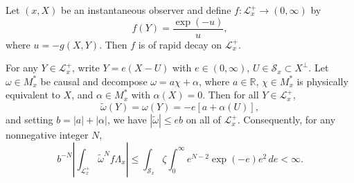Let $(x, X)$ be an instantaneous observer and define $f: \mathcal{L}_x^+ \rightarrow (0, \infty)$ by
$$f(Y) = \frac{\exp(-u)}{u},$$
where $u = -g(X, Y)$. Then $f$ is of rapid decay on $\mathcal{L}_x^+$.

For any $Y \in \mathcal{L}_x^+$, write $Y = e(X - U)$ with $e \in (0, \infty)$, $U \in \mathcal{S}_x \subset X^\perp$. Let $\omega \in M_x^*$ be causal and decompose $\omega = a\chi + \alpha$, where $a \in \mathbb{R}$, $\chi \in M_x^*$ is physically equivalent to $X$, and $\alpha \in M_x^*$ with $\alpha(X) = 0$. Then for all $Y \in \mathcal{L}_x^+$,
$$\tilde{\omega}(Y) = \omega(Y) = -e[a + \alpha(U)],$$
and setting $b = |a| + |\alpha|$, we have $|\tilde{\omega}| \leq e b$ on all of $\mathcal{L}_x^+$. Consequently, for any nonnegative integer $N$,
$$b^{-N} \left| \int_{\mathcal{L}_x^+} \tilde{\omega}^N f \Lambda_x \right| \leq \int_{\mathcal{S}_x} \zeta \int_0^\infty e^{N-2} \exp(-e) e^2 \, de < \infty.$$
